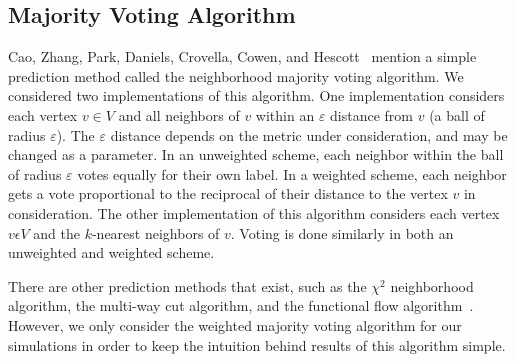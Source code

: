 \subsection{Majority Voting Algorithm}
Cao, Zhang, Park, Daniels, Crovella, Cowen, and Hescott~\cite{10.1371/journal.pone.0076339}
mention a simple prediction method called the neighborhood majority voting
algorithm. We considered two implementations of this algorithm. One 
implementation considers each vertex $v \in V$ and all neighbors of $v$
within an $\varepsilon$ distance from $v$ (a ball of radius $\varepsilon$).
The $\varepsilon$ distance depends on the metric under consideration, and
may be changed as a parameter. In an unweighted scheme, each neighbor
within the ball of radius $\varepsilon$ votes equally for their own label.
In a weighted scheme, each neighbor gets a vote proportional to the
reciprocal of their distance to the vertex $v$ in consideration. The other
implementation of this algorithm considers each vertex $v \epsilon V$ and
the $k$-nearest neighbors of $v$. Voting is done similarly in both an
unweighted and weighted scheme.

There are other prediction methods that exist, such as the $\chi^{2}$
neighborhood algorithm, the multi-way cut algorithm, and the functional
flow algorithm~\cite{10.1371/journal.pone.0076339}. However, we only
consider the weighted majority voting algorithm for our simulations in
order to keep the intuition behind results of this algorithm simple.

